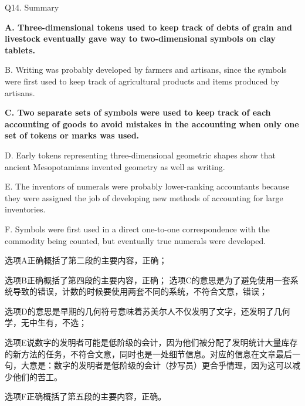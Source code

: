 \begin{blk}
    \begin{qst}
        Q14. Summary
    \end{qst}

    \begin{chc}
        \textbf{A. Three-dimensional tokens used to keep track of debts of grain and livestock eventually gave way to two-dimensional symbols on clay tablets.}

        B. Writing was probably developed by farmers and artisans, since the symbols were first used to keep track of agricultural products and items produced by artisans.

        \textbf{C. Two separate sets of symbols were used to keep track of each accounting of goods to avoid mistakes in the accounting when only one set of tokens or marks was used.}

        D. Early tokens representing three-dimensional geometric shapes show that ancient Mesopotamians invented geometry as well as writing.

        E. The inventors of numerals were probably lower-ranking accountants because they were assigned the job of developing new methods of accounting for large inventories.

        F. Symbols were first used in a direct one-to-one correspondence with the commodity being counted, but eventually true numerals were developed.
    \end{chc}

    \begin{nlz}
        选项A正确概括了第二段的主要内容，正确；

        选项B正确概括了第四段的主要内容，正确； 选项C的意思是为了避免使用一套系统导致的错误，计数的时候要使用两套不同的系统，不符合文意，错误；

        选项D的意思是早期的几何符号意味着苏美尔人不仅发明了文字，还发明了几何学，无中生有，不选；

        选项E说数字的发明者可能是低阶级的会计，因为他们被分配了发明统计大量库存的新方法的任务，不符合文意，同时也是一处细节信息。对应的信息在文章最后一句，大意是：数字的发明者是低阶级的会计（抄写员）更合乎情理，因为这可以减少他们的苦工。

        选项F正确概括了第五段的主要内容，正确。
    \end{nlz}
\end{blk}